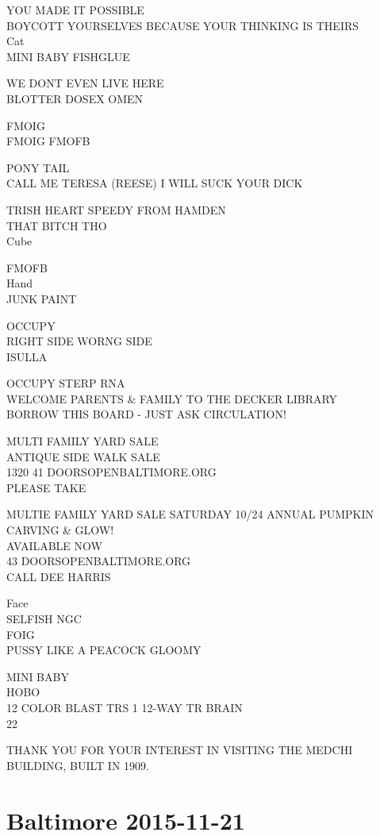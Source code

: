 \documentclass[10pt,letterpaper]{article}
\begin{document}
YOU MADE IT POSSIBLE\\
BOYCOTT YOURSELVES BECAUSE YOUR THINKING IS THEIRS\\
Cat\\
MINI BABY FISHGLUE

WE DONT EVEN LIVE HERE\\
BLOTTER DOSEX OMEN

FMOIG\\
FMOIG FMOFB

PONY TAIL\\
CALL ME TERESA (REESE) I WILL SUCK YOUR DICK

TRISH HEART SPEEDY FROM HAMDEN\\
THAT BITCH THO\\
Cube

FMOFB\\
Hand\\
JUNK PAINT

OCCUPY\\
RIGHT SIDE WORNG SIDE\\
ISULLA

OCCUPY STERP RNA\\
WELCOME PARENTS \& FAMILY TO THE DECKER LIBRARY\\
BORROW THIS BOARD {-} JUST ASK CIRCULATION!

MULTI FAMILY YARD SALE\\
ANTIQUE SIDE WALK SALE\\
1320 41 DOORSOPENBALTIMORE.ORG\\
PLEASE TAKE

MULTIE FAMILY YARD SALE SATURDAY 10/24 ANNUAL PUMPKIN CARVING \& GLOW!\\
AVAILABLE NOW\\
43 DOORSOPENBALTIMORE.ORG\\
CALL DEE HARRIS

Face\\
SELFISH NGC\\
FOIG\\
PUSSY LIKE A PEACOCK GLOOMY

MINI BABY\\
HOBO\\
12 COLOR BLAST TRS 1 12{-}WAY TR BRAIN\\
22

THANK YOU FOR YOUR INTEREST IN VISITING THE MEDCHI BUILDING, BUILT IN 1909.


\section*{Baltimore 2015-11-21}
\end{document}
